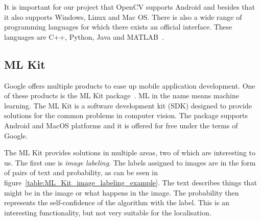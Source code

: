 \documentclass[thesis=B,english]{FITthesis}[2019/12/23]
\begin{document}
                It is important for our project that OpenCV supports Android and besides that it also supports Windows, Linux and Mac OS. There is also a wide range of programming languages for which there exists an official interface. These languages are C++, Python, Java and MATLAB~\cite{aboutOpenCV}.
                
            \subsection{ML Kit}
                Google offers multiple products to ease up mobile application development. One of these products is the ML Kit package~\cite{Google_ML_Kit}. ML in the name means machine learning. The ML Kit is a software development kit (SDK) designed to provide solutions for the common problems in computer vision. The package supports Android and MacOS platforms and it is offered for free under the terms of Google.
                
                The ML Kit provides solutions in multiple areas, two of which are interesting to us. The first one is \textit{image labeling}. The labels assigned to images are in the form of pairs of text and probability, as can be seen in figure~\ref{table:ML_Kit_image_labeling_example}. The text describes things that might be in the image or what happens in the image. The probability then represents the self-confidence of the algorithm with the label. This is an interesting functionality, but not very suitable for the localisation.
\end{document}
